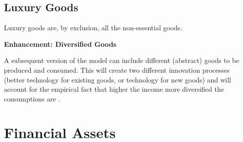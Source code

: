 \documentclass[a4paper, headings=standardclasses]{scrartcl}
\newenvironment{enh}[1][]{\begin{framed}\noindent\textbf{Enhancement: #1}\par}{\end{framed}}
\begin{document}
\subsection{Luxury Goods}
Luxury goods are, by exclusion, all the non-essential goods.

\begin{enh}[Diversified Goods]
	A subsequent version of the model can include different (abstract) goods to be produced and consumed. This will  create two different innovation processes (better technology for existing goods, or technology for new goods) and will account for the empirical fact that higher the income more diversified the consumptions are \parencite[cfr.][§2]{didomenico2022}.
\end{enh}

\section{Financial Assets}
	
	\printbibliography
	
\end{document}
